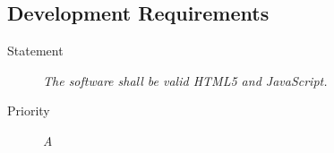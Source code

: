 \subsection{Development Requirements}

\NFR
\begin{description}
\item [Statement] \textit{The software shall be valid \gls{HTML5} and
    \gls{JavaScript}.}
\item [Priority] \textit{A}
\end{description}